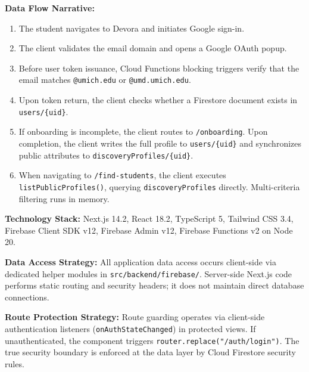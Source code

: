 \documentclass[11pt,letterpaper]{article}
\begin{document}
\textbf{Data Flow Narrative:}
\begin{enumerate}[leftmargin=*,noitemsep]
\item The student navigates to Devora and initiates Google sign-in.
\item The client validates the email domain and opens a Google OAuth popup.
\item Before user token issuance, Cloud Functions blocking triggers verify that the email matches \texttt{@umich.edu} or \texttt{@umd.umich.edu}.
\item Upon token return, the client checks whether a Firestore document exists in \texttt{users/\{uid\}}.
\item If onboarding is incomplete, the client routes to \texttt{/onboarding}. Upon completion, the client writes the full profile to \texttt{users/\{uid\}} and synchronizes public attributes to \texttt{discoveryProfiles/}\allowbreak\texttt{\{uid\}}.
\item When navigating to \texttt{/find-students}, the client executes \texttt{listPublicProfiles()}, querying \texttt{discoveryProfiles} directly. Multi-criteria filtering runs in memory.
\end{enumerate}

\textbf{Technology Stack:} Next.js 14.2, React 18.2, TypeScript 5, Tailwind CSS 3.4, Firebase Client SDK v12, Firebase Admin v12, Firebase Functions v2 on Node 20.

\textbf{Data Access Strategy:} All application data access occurs client-side via dedicated helper modules in \texttt{src/backend/firebase/}. Server-side Next.js code performs static routing and security headers; it does not maintain direct database connections.

\textbf{Route Protection Strategy:} Route guarding operates via client-side authentication listeners (\texttt{onAuthState}\allowbreak\texttt{Changed}) in protected views. If unauthenticated, the component triggers \texttt{router.replace("/auth/login")}. The true security boundary is enforced at the data layer by Cloud Firestore security rules.
\end{document}
